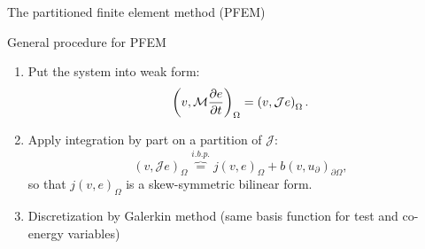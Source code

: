 \documentclass[aspectratio=169]{ISAE-Beamer}
\begin{document}
\begin{frame}{The partitioned finite element method (PFEM)}

\begin{block}{General procedure for PFEM}
	\setlength{\abovedisplayskip}{1pt}
	\setlength{\belowdisplayskip}{1pt}
	\begin{enumerate}
		\item Put the system into weak form:
		\begin{equation*}
		\left(v, \mathcal{M} \diffp{e}{t} \right)_{\Omega} = \left(v, \mathcal{J} e \right)_{\Omega}.
		\end{equation*}
		\item Apply integration by part on a partition of $\mathcal{J}$:
		\begin{equation*}
		\left(v, \mathcal{J} e \right)_{\Omega} \overbrace{=}^{i.b.p.} j(v, e)_{\Omega} + b(v, u_\partial)_{\partial \Omega},
		\end{equation*}
		so that $j(v, e)_{\Omega}$ is a skew-symmetric bilinear form.
		\item Discretization by Galerkin method (same basis function for test and co-energy variables)
	\end{enumerate}
\end{block}
\end{frame}
\end{document}
